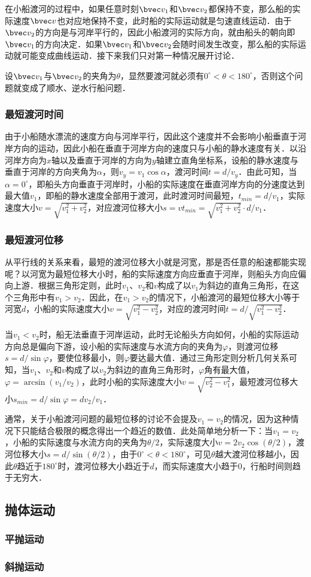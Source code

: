 在小船渡河的过程中，如果任意时刻$\bvec v_1$和$\bvec v_2$都保持不变，那么船的实际速度$\bvec v$也对应地保持不变，此时船的实际运动就是匀速直线运动．由于$\bvec v_2$的方向是与河岸平行的，因此小船渡河的实际方向，就由船头的朝向即$\bvec v_1$的方向决定．如果$\bvec v_1$和$\bvec v_2$会随时间发生改变，那么船的实际运动就可能变成曲线运动．接下来我们只对第一种情况展开讨论．

设$\bvec v_1$与$\bvec v_2$的夹角为$\theta$，显然要渡河就必须有$0^\circ < \theta < 180^\circ $，否则这个问题就变成了顺水、逆水行船问题．

\subsubsection{最短渡河时间}

由于小船随水漂流的速度方向与河岸平行，因此这个速度并不会影响小船垂直于河岸方向的运动，因此小船在垂直于河岸方向的速度只与小船的静水速度有关．以沿河岸方向为$x$轴以及垂直于河岸的方向为$y$轴建立直角坐标系，设船的静水速度与垂直于河岸的方向夹角为$\alpha$，则$v_y = v_1 \cos \alpha$，渡河时间$t=d/v_y$．由此可知，当$\alpha = 0^\circ$，即船头方向垂直于河岸时，小船的实际速度在垂直河岸方向的分速度达到最大值$v_1$，即船的静水速度全部用于渡河，此时渡河时间最短，$t_{min}=d/v_1$，实际速度大小$v=\sqrt{v_1^2+v_2^2}$，对应渡河位移大小$s=vt_{min}=\sqrt{v_1^2+v_2^2}\cdot d/v_1$．

\subsubsection{最短渡河位移}

从平行线的关系来看，最短的渡河位移大小就是河宽，那是否任意的船速都能实现呢？以河宽为最短位移大小时，船的实际速度方向应垂直于河岸，则船头方向应偏向上游．根据三角形定则，此时$v_1$、$v_2$和$v$构成了以$v_1$为斜边的直角三角形，在这个三角形中有$v_1>v_2$．因此，在$v_1>v_2$的情况下，小船渡河的最短位移大小等于河宽$d$，小船的实际速度大小$v=\sqrt{v_1^2-v_2^2}$，对应的渡河时间$t=d/\sqrt{v_1^2-v_2^2}$．

当$v_1<v_2$时，船无法垂直于河岸运动，此时无论船头方向如何，小船的实际运动方向总是偏向下游，设小船的实际速度与水流方向的夹角为$\varphi$，则渡河位移$s = d/\sin \varphi$，要使位移最小，则$\varphi$要达最大值．通过三角形定则分析几何关系可知，当$v_1$、$v_2$和$v$构成了以$v_2$为斜边的直角三角形时，$\varphi$角有最大值，$\varphi=\arcsin(v_1/v_2)$，此时小船的实际速度大小$v=\sqrt{v_2^2-v_1^2}$，最短渡河位移大小$s_{min} = d/\sin \varphi=dv_2/v_1$．

通常，关于小船渡河问题的最短位移的讨论不会提及$v_1=v_2$的情况，因为这种情况下只能结合极限的概念得出一个趋近的数值．此处简单地分析一下：当$v_1=v_2$，小船的实际速度与水流方向的夹角为$\theta /2$，实际速度大小$v=2v_2\cos(\theta /2)$，渡河位移大小$s= d/\sin(\theta/2)$，由于$0^\circ < \theta < 180^\circ $，可见$\theta$越大渡河位移越小，因此$\theta$趋近于$180^\circ $时，渡河位移大小趋近于$d$，而实际速度大小趋于$0$，行船时间则趋于无穷大．

\subsection{抛体运动}

\subsubsection{平抛运动}

\subsubsection{斜抛运动}
